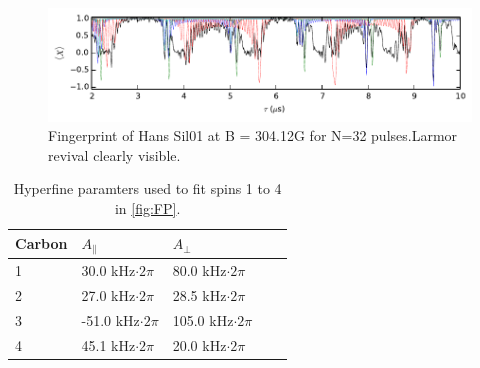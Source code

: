 






\begin{figure}[htbp]
    \centering
    \includegraphics{Img/Truefingerprint.pdf}
    \caption{Fingerprint of Hans Sil01 at B = 304.12G for N=32 pulses.Larmor revival clearly visible. }
    \label{fig:FP}
\end{figure}

\begin{table}[htbp]
    \begin{tabular}{lllll}
    Carbon &  $A_{\parallel} $ & $A_{\perp}$ \\ \hline
    1         & 30.0 kHz$\cdot 2 \pi$             & 80.0 kHz$\cdot 2 \pi$                \\
    2         & 27.0 kHz$\cdot 2 \pi$             & 28.5 kHz$\cdot 2 \pi$              \\
    3         & -51.0 kHz$\cdot 2 \pi$          & 105.0 kHz$\cdot 2 \pi$              \\
    4         & 45.1 kHz$\cdot 2 \pi$           & 20.0 kHz$\cdot 2 \pi$                \\
    \end{tabular}
    \caption{Hyperfine paramters used to fit spins 1 to 4 in \autoref{fig:FP}.}
    \label{tbl:HF_par}
\end{table}

